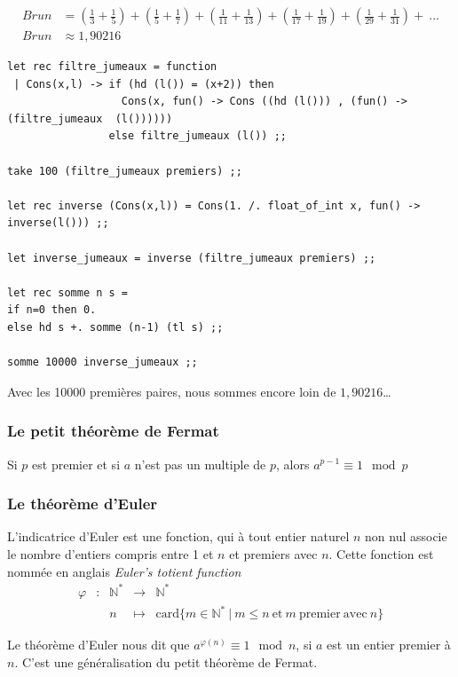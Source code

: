 \documentclass[11pt]{book}
\begin{document}
\begin{align*}
   Brun &= (\frac{1}{3} + \frac{1}{5}) + (\frac{1}{5} + \frac{1}{7}) + (\frac{1}{11} + \frac{1}{13}) + (\frac{1}{17} + \frac{1}{19}) + (\frac{1}{29} + \frac{1}{31}) +\  ...  \\
   Brun &\approx 1,90216
\end{align*}


\begin{Verbatim}
let rec filtre_jumeaux = function
 | Cons(x,l) -> if (hd (l()) = (x+2)) then 
                  Cons(x, fun() -> Cons ((hd (l())) , (fun() ->  (filtre_jumeaux  (l())))))
                else filtre_jumeaux (l()) ;;

take 100 (filtre_jumeaux premiers) ;;

let rec inverse (Cons(x,l)) = Cons(1. /. float_of_int x, fun() -> inverse(l())) ;;

let inverse_jumeaux = inverse (filtre_jumeaux premiers) ;;

let rec somme n s =
if n=0 then 0.
else hd s +. somme (n-1) (tl s) ;;

somme 10000 inverse_jumeaux ;;
 \end{Verbatim}

 Avec les 10000 premières paires, nous sommes encore loin de $1,90216$\dots

\subsubsection{Le petit théorème de Fermat}
Si $p$ est premier et si $a$ n’est pas un multiple de $p$, alors $a^{p−1}≡1  \mod p$

\subsubsection{Le théorème d'Euler}
L'indicatrice d'Euler est une fonction, qui à tout entier naturel $n$ non nul associe
 le nombre d'entiers compris entre 1 et $n$ et premiers avec $n$. Cette fonction est nommée en anglais
 \textit{Euler's totient function}
$$
\begin{array}{ccccl}
  \varphi & : & \mathbb{N}^* & \longrightarrow & \mathbb{N}^* \\
   & & n& \longmapsto &\mathrm{card}\{ m \in \mathbb{N}^* ~|~m\le n~  \text{et}~m~\mathrm{premier~avec}~n \}
\end{array}
$$


Le théorème d'Euler nous dit que $ a^{\varphi (n)} \equiv 1 \mod n $, si $a$ est un entier premier à $n$.
C'est une généralisation du petit théorème de Fermat.
\end{document}
